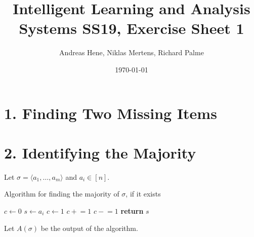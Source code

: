 \documentclass{article}
\newcommand{\pluseq}{\mathrel{+}=}
\newcommand{\minuseq}{\mathrel{-}=}
\newenvironment{claim}[1]{\par\noindent\underline{Claim:}\space#1}{}
\begin{document}
\title{Intelligent Learning and Analysis Systems SS19, Exercise Sheet 1}
\author{Andreas Hene, Niklas Mertens, Richard Palme}
\date{\today}
\maketitle

\section*{1. Finding Two Missing Items}



\section*{2. Identifying the Majority}

Let $\sigma = \langle a_1, \hdots, a_m \rangle$ and $a_i \in [n]$. \\

\begin{algorithm}
\caption{Algorithm for finding the majority of $\sigma$, if it exists}
\begin{algorithmic}[1]

\State $c \gets 0$
        \State$s \gets a_i$
        \State$c \gets 1$
    \EndIf
        \State$c \pluseq 1$
    \Else
        \State$c \minuseq 1$
    \EndIf
\EndFor
\State\textbf{return} $s$

\end{algorithmic}
\end{algorithm}

Let $A(\sigma)$ be the output of the algorithm. \\

\end{document}
